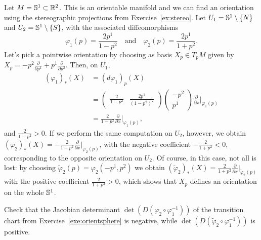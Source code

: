 \begin{example}\label{exe:orientsphere}
  Let $M = \mathbb{S}^1\subset \mathbb{R}^2$.
  This is an orientable manifold and we can find an orientation using the stereographic projections from Exercise~\ref{ex:stereo}.
  Let $U_1 = \mathbb{S}^1\setminus\{N\}$ and $U_2 = \mathbb{S}^1\setminus\{S\}$, with the associated diffeomorphisms
  \begin{equation}
    \varphi_1(p) = \frac{2p^1}{1-p^2}
    \quad\mbox{and}\quad
    \varphi_2(p) = \frac{2p^1}{1+p^2}.
  \end{equation}
  Let's pick a pointwise orientation by choosing as basis $X_p\in T_pM$ given by $X_p = -p^2 \frac{\partial}{\partial p^1} + p^1 \frac{\partial}{\partial p^2}$.
  Then, on $U_1$,
  \begin{align}
    (\varphi_1)_*(X) &= (d\varphi_1)_p(X) \\
    &= \left(\begin{smallmatrix}
      \frac{2}{1-p^2} & \frac{2p^1}{(1-p^2)^2}
    \end{smallmatrix}\right)
    \left(\begin{smallmatrix}
      -p^2 \\ p^1
    \end{smallmatrix}\right) \frac{\partial}{\partial x}\Big|_{\varphi_1(p)}\\
    &= \frac{2}{1-p^2} \frac{\partial}{\partial x}\Big|_{\varphi_1(p)}, 
  \end{align}
  and $\frac{2}{1-p^2}>0$.
  If we perform the same computation on $U_2$, however, we obtain $(\varphi_2)_*(X) = -\frac{2}{1+p^2}\frac{\partial}{\partial x}\Big|_{\varphi_2(p)}$, with the negative coefficient $-\frac{2}{1+p^2} < 0$, corresponding to the opposite orientation on $U_2$.
  Of course, in this case, not all is lost: by choosing $\widetilde\varphi_2(p) = \varphi_2(-p^1, p^2)$ we obtain $(\widetilde\varphi_2)_*(X) = \frac{2}{1+p^2} \frac{\partial}{\partial x}\Big|_{\widetilde\varphi_2(p)}$ with the positive coefficient $\frac{2}{1+p^2} > 0$, which shows that $X_p$ defines an orientation on the whole $\mathbb{S}^1$.
\end{example}

\begin{exercise}
  Check that the Jacobian determinant $\det(D(\varphi_2\circ \varphi_1^{-1}))$ of the transition chart from Exercise~\ref{exe:orientsphere} is negative, while $\det(D(\widetilde\varphi_2\circ \varphi_1^{-1}))$ is positive.
\end{exercise}

